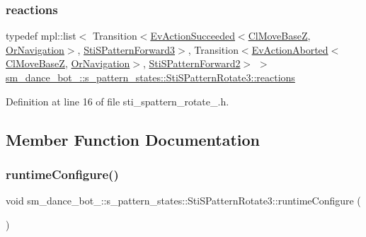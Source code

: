 \subsubsection{\texorpdfstring{reactions}{reactions}}
{\footnotesize\ttfamily typedef mpl\+::list$<$ Transition$<$\hyperlink{structsmacc_1_1default__events_1_1EvActionSucceeded}{Ev\+Action\+Succeeded}$<$\hyperlink{classcl__move__base__z_1_1ClMoveBaseZ}{Cl\+Move\+BaseZ}, \hyperlink{classsm__dance__bot__2_1_1OrNavigation}{Or\+Navigation}$>$, \hyperlink{structsm__dance__bot__2_1_1s__pattern__states_1_1StiSPatternForward3}{Sti\+S\+Pattern\+Forward3}$>$, Transition$<$\hyperlink{structsmacc_1_1default__events_1_1EvActionAborted}{Ev\+Action\+Aborted}$<$\hyperlink{classcl__move__base__z_1_1ClMoveBaseZ}{Cl\+Move\+BaseZ}, \hyperlink{classsm__dance__bot__2_1_1OrNavigation}{Or\+Navigation}$>$, \hyperlink{structsm__dance__bot__2_1_1s__pattern__states_1_1StiSPatternForward2}{Sti\+S\+Pattern\+Forward2}$>$ $>$ \hyperlink{structsm__dance__bot__2_1_1s__pattern__states_1_1StiSPatternRotate3_a4a91ddf822cb87636206ed69a5f216b4}{sm\+\_\+dance\+\_\+bot\+\_\+::s\+\_\+pattern\+\_\+states\+::\+Sti\+S\+Pattern\+Rotate3\+::reactions}}



Definition at line 16 of file sti\+\_\+spattern\+\_\+rotate\+\_.\+h.



\subsection{Member Function Documentation}
\mbox{\label{structsm__dance__bot__2_1_1s__pattern__states_1_1StiSPatternRotate3_a89ccdeb172c7bd0c81566bc6ef428ec2}} 
\subsubsection{\texorpdfstring{runtime\+Configure()}{runtimeConfigure()}}
{\footnotesize\ttfamily void sm\+\_\+dance\+\_\+bot\+\_\+::s\+\_\+pattern\+\_\+states\+::\+Sti\+S\+Pattern\+Rotate3\+::runtime\+Configure (\begin{DoxyParamCaption}{ }\end{DoxyParamCaption})\hspace{0.3cm}{\ttfamily [inline]}}



